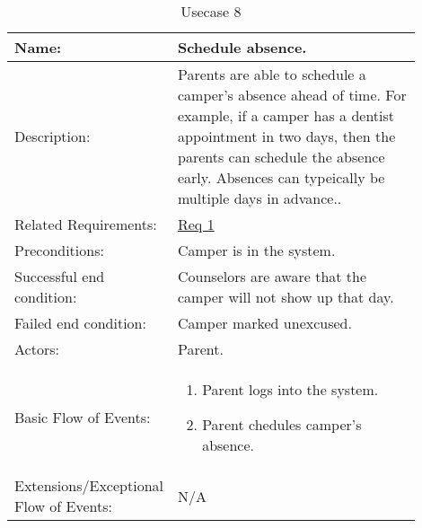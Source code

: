 \documentclass[11pt]{article}
\begin{document}
\begin{table}[!htb]
\caption{Usecase 8}
\label{des:schedule absence}
\begin{center}
\begin{tabular}{p{0.30\linewidth}p{0.60\linewidth}}
	Name: & Schedule absence.\\\hline
	Description: & Parents are able to schedule a camper's absence ahead of time. For example, if a camper has a dentist appointment in two days, then the parents can schedule the absence early. Absences can typeically be multiple days in advance..\\\hline
	Related Requirements:& \hyperlink{Req1}{Req 1}\\\hline
	Preconditions:& Camper is in the system.\\\hline
	Successful end condition:& Counselors are aware that the camper will not show up that day. \\\hline
	Failed end condition:& Camper marked unexcused.\\\hline
	Actors:& Parent. \\\hline
	Basic Flow of Events: & \begin{enumerate}[topsep=0pt]
		\item Parent logs into the system.
		\item Parent chedules camper's absence.
	\end{enumerate}\\\hline
	Extensions/Exceptional Flow of Events: & \vspace*{.25em}  N/A
\end{tabular}
\end{center}
\end{table}



\end{document}
